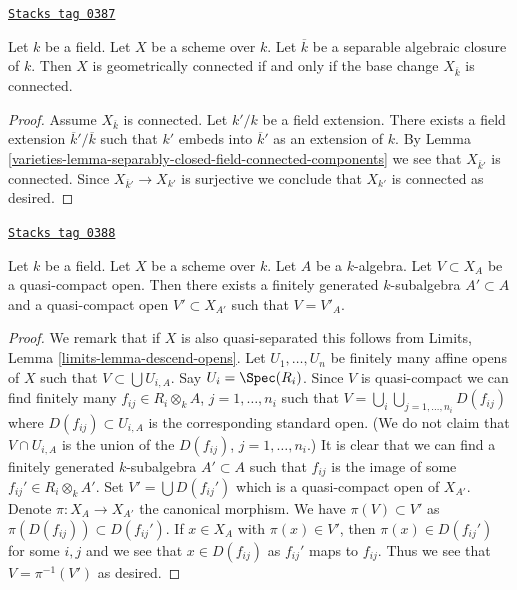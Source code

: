 \begin{lemma}
\label{varieties-lemma-characterize-geometrically-connected}
\href{https://stacks.math.columbia.edu/tag/0387}{\texttt{Stacks tag 0387}}

Let $k$ be a field.
Let $X$ be a scheme over $k$.
Let $\overline{k}$ be a separable algebraic closure of $k$.
Then $X$ is geometrically connected if and only if the base change
$X_{\overline{k}}$ is connected.
\end{lemma}

\begin{proof}

Assume $X_{\overline{k}}$ is connected.
Let $k'/k$ be a field extension.
There exists a field extension $\overline{k}'/\overline{k}$
such that $k'$ embeds into $\overline{k}'$ as an extension of $k$.
By Lemma \ref{varieties-lemma-separably-closed-field-connected-components}
we see that $X_{\overline{k}'}$ is connected.
Since $X_{\overline{k}'} \to X_{k'}$ is surjective we conclude
that $X_{k'}$ is connected as desired.
\end{proof}

\begin{lemma}
\label{varieties-lemma-descend-open}
\href{https://stacks.math.columbia.edu/tag/0388}{\texttt{Stacks tag 0388}}

Let $k$ be a field.
Let $X$ be a scheme over $k$.
Let $A$ be a $k$-algebra.
Let $V \subset X_A$ be a quasi-compact open.
Then there exists a finitely generated $k$-subalgebra $A' \subset A$
and a quasi-compact open $V' \subset X_{A'}$
such that $V = V'_A$.
\end{lemma}

\begin{proof}
We remark that if $X$ is also quasi-separated this follows from
Limits, Lemma \ref{limits-lemma-descend-opens}. Let
$U_1, \ldots, U_n$ be finitely many affine opens of $X$
such that $V \subset \bigcup U_{i, A}$. Say $U_i = \Spec(R_i)$.
Since $V$ is quasi-compact we can find finitely many
$f_{ij} \in R_i \otimes_k A$, $j = 1, \ldots, n_i$
such that $V = \bigcup_i \bigcup_{j = 1, \ldots, n_i} D(f_{ij})$
where $D(f_{ij}) \subset U_{i, A}$ is the corresponding standard
open. (We do not claim that $V \cap U_{i, A}$ is the union
of the $D(f_{ij})$, $j = 1, \ldots, n_i$.)
It is clear that we can find a finitely generated $k$-subalgebra
$A' \subset A$ such that $f_{ij}$ is the image of some
$f_{ij}' \in R_i \otimes_k A'$.
Set $V' = \bigcup D(f_{ij}')$ which is a quasi-compact open of $X_{A'}$.
Denote $\pi : X_A \to X_{A'}$ the canonical morphism.
We have $\pi(V) \subset V'$ as $\pi(D(f_{ij})) \subset D(f_{ij}')$.
If $x \in X_A$ with $\pi(x) \in V'$, then $\pi(x) \in D(f_{ij}')$
for some $i, j$ and we see that $x \in D(f_{ij})$ as $f_{ij}'$
maps to $f_{ij}$. Thus we see that $V = \pi^{-1}(V')$ as desired.
\end{proof}

